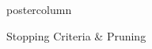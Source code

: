 \documentclass{beamer}
\begin{document}
\begin{frame}[fragile]{}
\begin{columns}
\begin{column}{.31\textwidth}
\begin{beamercolorbox}[center]{postercolumn}
\begin{minipage}{.98\textwidth}
{\begin{myblock}{Stopping Criteria \& Pruning}
						\hspace*{1ex}
						
                    \end{myblock}
				}
			\end{minipage}
		\end{beamercolorbox}
	\end{column}
\end{columns}
\end{frame}
\end{document}

